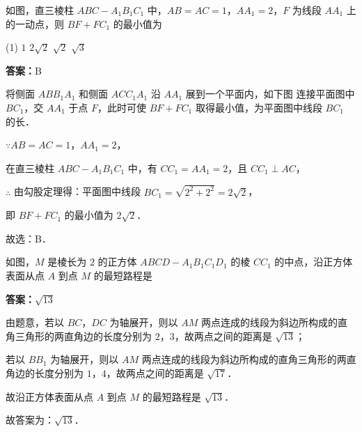 \begin{example}[\bkstar{3}{5}]
如图，直三棱柱 $ABC-A_1B_1C_1$ 中，$AB=AC=1$，$AA_1=2$，$F$ 为线段 $AA_1$ 上的一动点，则 $BF+FC_1$ 的最小值为
\begin{tasks}(1)
    \task $1$
    \task $2\sqrt{2}$
    \task $\sqrt{2}$
    \task $\sqrt{3}$
\end{tasks}
\end{example}
\begin{solution}
\textbf{答案：}B

将侧面 $ABB_1A_1$ 和侧面 $ACC_1A_1$ 沿 $AA_1$ 展到一个平面内，如下图
连接平面图中 $BC_1$，交 $AA_1$ 于点 $F$，此时可使 $BF+FC_1$ 取得最小值，为平面图中线段 $BC_1$ 的长．

$\because AB=AC=1$，$AA_1=2$，

在直三棱柱 $ABC-A_1B_1C_1$ 中，有 $CC_1=AA_1=2$，且 $CC_1\perp AC$，

$\therefore$ 由勾股定理得：平面图中线段 $BC_1=\sqrt{2^2+2^2}=2\sqrt{2}$，

即 $BF+FC_1$ 的最小值为 $2\sqrt{2}$．

故选：B．
\end{solution}

\vspace{2em}

\begin{example}[\bkstar{3}{5}]
如图，$M$ 是棱长为 $2$ 的正方体 $ABCD-A_1B_1C_1D_1$ 的棱 $CC_1$ 的中点，沿正方体表面从点 $A$ 到点 $M$ 的最短路程是
\end{example}
\begin{solution}
\textbf{答案：}$\sqrt{13}$

由题意，若以 $BC$，$DC$ 为轴展开，则以 $AM$ 两点连成的线段为斜边所构成的直角三角形的两直角边的长度分别为 $2$，$3$，故两点之间的距离是 $\sqrt{13}$；

若以 $BB_1$ 为轴展开，则以 $AM$ 两点连成的线段为斜边所构成的直角三角形的两直角边的长度分别为 $1$，$4$，故两点之间的距离是 $\sqrt{17}$．

故沿正方体表面从点 $A$ 到点 $M$ 的最短路程是 $\sqrt{13}$．

故答案为：$\sqrt{13}$．
\end{solution}

\vspace{2em}
